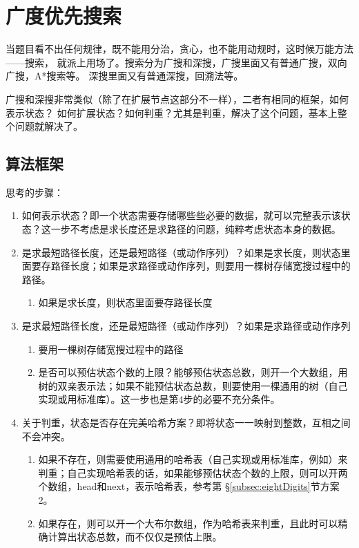 \chapter{广度优先搜索}
当题目看不出任何规律，既不能用分治，贪心，也不能用动规时，这时候万能方法——搜索，
就派上用场了。搜索分为广搜和深搜，广搜里面又有普通广搜，双向广搜，A*搜索等。
深搜里面又有普通深搜，回溯法等。

广搜和深搜非常类似（除了在扩展节点这部分不一样），二者有相同的框架，如何表示状态？
如何扩展状态？如何判重？尤其是判重，解决了这个问题，基本上整个问题就解决了。


\section{算法框架} %
思考的步骤：
\begin{enumerate}
\item 如何表示状态？即一个状态需要存储哪些些必要的数据，就可以完整表示该状态？这一步不考虑是求长度还是求路径的问题，纯粹考虑状态本身的数据。
\item 是求最短路径长度，还是最短路径（或动作序列）？如果是求长度，则状态里面要存路径长度；如果是求路径或动作序列，则要用一棵树存储宽搜过程中的路径。
    \begin{enumerate}
    \item 如果是求长度，则状态里面要存路径长度
    \end{enumerate}
\item 是求最短路径长度，还是最短路径（或动作序列）？如果是求路径或动作序列
    \begin{enumerate}
    \item 要用一棵树存储宽搜过程中的路径
    \item 是否可以预估状态个数的上限？能够预估状态总数，则开一个大数组，用树的双亲表示法；如果不能预估状态总数，则要使用一棵通用的树（自己实现或用标准库）。这一步也是第4步的必要不充分条件。
   \end{enumerate}
\item 关于判重，状态是否存在完美哈希方案？即将状态一一映射到整数，互相之间不会冲突。
    \begin{enumerate}
    \item 如果不存在，则需要使用通用的哈希表（自己实现或用标准库，例如）来判重；自己实现哈希表的话，如果能够预估状态个数的上限，则可以开两个数组，head和next，表示哈希表，参考第 \S \ref{subsec:eightDigits}节方案2。
    \item 如果存在，则可以开一个大布尔数组，作为哈希表来判重，且此时可以精确计算出状态总数，而不仅仅是预估上限。
    \end{enumerate}
\end{enumerate}

